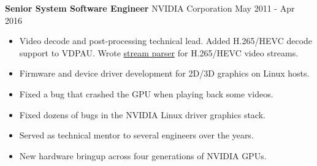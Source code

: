 \textbf{Senior System Software Engineer} NVIDIA Corporation \hfill May 2011 - Apr 2016

\begin{itemize} \itemsep -2pt

\item Video decode and post-processing technical lead. Added H.265/HEVC decode
      support to VDPAU. Wrote
      \href{https://github.com/NVIDIA/vdpau-hevc-example}{stream parser}
      for H.265/HEVC video streams.

\item Firmware and device driver development for 2D/3D graphics on Linux hosts.

\item Fixed a bug that crashed the GPU when playing back some videos.

\item Fixed dozens of  bugs in the NVIDIA Linux driver graphics stack.

\item Served as technical mentor to several engineers over the years.

\item New hardware bringup across four generations of NVIDIA GPUs.

\end{itemize}
